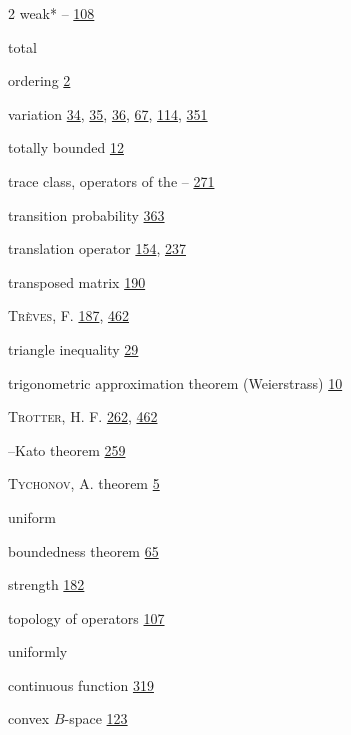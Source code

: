 \begin{multicols}{2}
\hspace*{1.1em}weak* -- \hyperlink{page.108}{108}\par
\noindent total\par
\hspace*{1.1em}ordering \hyperlink{page.2}{2}\par
\hspace*{1.1em}variation \hyperlink{page.34}{34}, \hyperlink{page.35}{35}, \hyperlink{page.36}{36}, \hyperlink{page.67}{67}, \hyperlink{page.114}{114}, \hyperlink{page.351}{351}\par
\noindent totally bounded \hyperlink{page.12}{12}\par
\noindent trace class, operators of the -- \hyperlink{page.271}{271}\par
\noindent transition probability \hyperlink{page.363}{363}\par
\noindent translation operator \hyperlink{page.154}{154}, \hyperlink{page.237}{237}\par
\noindent transposed matrix \hyperlink{page.190}{190}\par
\noindent \textsc{Trèves}, F. \hyperlink{page.187}{187}, \hyperlink{page.462}{462}\par
\noindent triangle inequality \hyperlink{page.29}{29}\par
\noindent trigonometric approximation theorem (Weierstrass) \hyperlink{page.10}{10}\par
\noindent \textsc{Trotter}, H. F. \hyperlink{page.262}{262}, \hyperlink{page.462}{462}\par
\hspace*{1.1em}--Kato theorem \hyperlink{page.259}{259}\par
\noindent \textsc{Tychonov}, A. theorem \hyperlink{page.5}{5}\par
\noindent uniform\par
\hspace*{1.1em}boundedness theorem \hyperlink{page.65}{65}\par
\hspace*{1.1em}strength \hyperlink{page.182}{182}\par
\hspace*{1.1em}topology of operators \hyperlink{page.107}{107}\par
\noindent uniformly\par
\hspace*{1.1em}continuous function \hyperlink{page.319}{319}\par
\hspace*{1.1em}convex $B$-space \hyperlink{page.123}{123}\par

\end{multicols}
